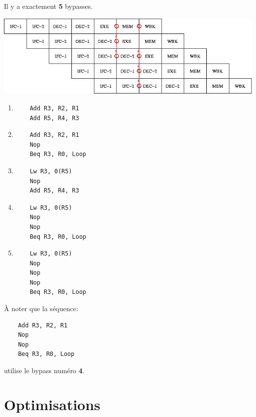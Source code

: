 \begin{correction}

  Il y a exactement \textbf{5} bypasses.

  \begin{center}
    \includegraphics[scale=0.7]{figures/correction-pipeline.jpg}
  \end{center}

  \begin{enumerate}
    \item
      \begin{verbatim}
	Add R3, R2, R1
	Add R5, R4, R3
      \end{verbatim}
    \item
      \begin{verbatim}
	Add R3, R2, R1
	Nop
	Beq R3, R0, Loop
      \end{verbatim}
    \item
      \begin{verbatim}
	Lw R3, 0(R5)
	Nop
	Add R5, R4, R3
      \end{verbatim}
    \item
      \begin{verbatim}
	Lw R3, 0(R5)
	Nop
	Nop
	Beq R3, R0, Loop
      \end{verbatim}
    \item
      \begin{verbatim}
	Lw R3, 0(R5)
	Nop
	Nop
	Nop
	Beq R3, R0, Loop
      \end{verbatim}
  \end{enumerate}

  \`A noter que la s\'equence:

  \begin{verbatim}
    Add R3, R2, R1
    Nop
    Nop
    Beq R3, R0, Loop  
  \end{verbatim}

  utilise le bypass num\'ero \textbf{4}.

\end{correction}

%
%

\section{Optimisations}

